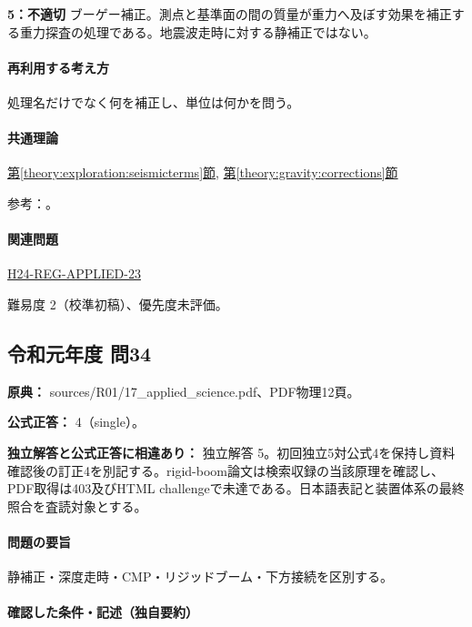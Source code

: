 \noindent\textbf{5：不適切} ブーゲー補正。測点と基準面の間の質量が重力へ及ぼす効果を補正する重力探査の処理である。地震波走時に対する静補正ではない。\par

\paragraph{再利用する考え方} 処理名だけでなく何を補正し、単位は何かを問う。

\paragraph{共通理論} \hyperref[theory:exploration:seismicterms]{第\ref*{theory:exploration:seismicterms}節}, \hyperref[theory:gravity:corrections]{第\ref*{theory:gravity:corrections}節}

\par 参考：\cite{usgs_refraction2013,epa_seismic_reflection,usgs_static2004,usgs_processing2000}。

\paragraph{関連問題} \hyperref[q:h24-reg-applied-23]{H24-REG-APPLIED-23}

\par 難易度 2（校準初稿）、優先度未評価。

\subsection{令和元年度 問34}
\label{q:r01-reg-applied-34}

\noindent\textbf{原典：} sources/R01/17\_applied\_science.pdf、PDF物理12頁。

\textbf{公式正答：} 4（single）。

\par\textbf{独立解答と公式正答に相違あり：} 独立解答 5。初回独立5対公式4を保持し資料確認後の訂正4を別記する。rigid-boom論文は検索収録の当該原理を確認し、PDF取得は403及びHTML challengeで未達である。日本語表記と装置体系の最終照合を査読対象とする。

\paragraph{問題の要旨} 静補正・深度走時・CMP・リジッドブーム・下方接続を区別する。

\paragraph{確認した条件・記述（独自要約）}\mbox{}\par

